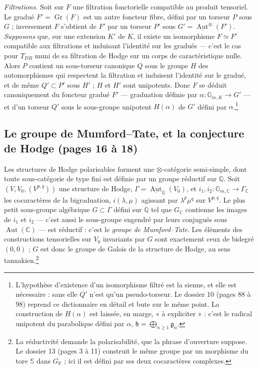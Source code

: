 \documentclass[11pt,a4paper]{article}
\begin{document}
\emph{Filtrations.} Soit sur $F$ une filtration fonctorielle compatible au
produit tensoriel. Le gradué $F' = \operatorname{Gr}(F)$ est un autre foncteur
fibre, défini par un torseur $P$ sous $G$ ; inversement $F$ s'obtient de $F'$
par un torseur $P'$ sous $G' = \underline{\operatorname{Aut}}^{\otimes}(F')$.
\emph{Supposons} que, sur une extension $K'$ de $K$, il existe un isomorphisme
$F \simeq F'$ compatible aux filtrations et induisant l'identité sur les
gradués --- c'est le cas pour $T_{DR}$ muni de sa filtration de Hodge sur un
corps de caractéristique nulle. Alors $P$ contient un sous-torseur canonique $Q$
sous le groupe $H$ des automorphismes qui respectent la filtration et induisent
l'identité sur le gradué, et de même $Q' \subset P'$ sous $H'$ ; $H$ et $H'$
sont unipotents. Donc $F$ se déduit canoniquement du foncteur gradué $F'$ ---
graduation définie par $\alpha \colon \mathbb{G}_{m,K} \to G'$ --- et d'un torseur
$Q'$ sous le sous-groupe unipotent $H(\alpha)$ de $G'$ défini par
$\alpha$.\footnote{L'hypothèse d'existence d'un isomorphisme filtré est la sienne,
et elle est nécessaire : sans elle $Q'$ n'est qu'un pseudo-torseur. Le dossier 10
(pages 88 à 98) reprend ce dictionnaire en détail et bute sur le même point. La
construction de $H(\alpha)$ est laissée, en marge, « à expliciter » : c'est le
radical unipotent du parabolique défini par $\alpha$, $\mathfrak{h} =
\bigoplus_{n \geqslant 1} \mathfrak{g}_{n}$.}

\subsection*{Le groupe de Mumford--Tate, et la conjecture de Hodge (pages 16 à 18)}

Les structures de Hodge polarisables forment une $\otimes$-catégorie
semi-simple, dont toute sous-catégorie de type fini est définie par un groupe
réductif sur $\mathbb{Q}$. Soit $(V, V_{0}, (V^{p,q}))$ une structure de Hodge,
$\Gamma = \underline{\operatorname{Aut}}_{\mathbb{Q}}(V_{0})$, et $i_{1}, i_{2}
\colon \mathbb{G}_{m,\mathbb{C}} \to \Gamma_{\mathbb{C}}$ les cocaractères de la
bigraduation, $i(\lambda, \mu)$ agissant par $\lambda^{p}\mu^{q}$ sur $V^{p,q}$.
Le plus petit sous-groupe algébrique $G \subset \Gamma$ défini sur $\mathbb{Q}$
tel que $G_{\mathbb{C}}$ contienne les images de $i_{1}$ et $i_{2}$ --- c'est
aussi le sous-groupe engendré par leurs conjugués sous
$\operatorname{Aut}(\mathbb{C})$ --- est réductif : c'est le \emph{groupe de
Mumford--Tate}. Les éléments des constructions tensorielles sur $V_{0}$
invariants par $G$ sont exactement ceux de bidegré $(0,0)$ ; $G$ est donc le
groupe de Galois de la structure de Hodge, au sens tannakien.\footnote{La
réductivité demande la polarisabilité, que la phrase d'ouverture suppose. Le
dossier 13 (pages 3 à 11) construit le même groupe par un morphisme du tore
$\mathbb{S}$ dans $G_{\mathbb{R}}$ ; ici il est défini par ses deux cocaractères
complexes.}
\end{document}
